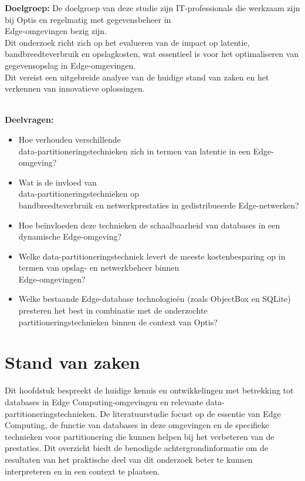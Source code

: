\textbf{Doelgroep:}
De doelgroep van deze studie zijn IT-professionals die werkzaam zijn bij Optis en regelmatig met gegevensbeheer in \\ Edge-omgevingen bezig zijn. \\

Dit onderzoek richt zich op het evalueren van de impact op latentie, bandbreedteverbruik en opslagkosten, wat essentieel is voor het optimaliseren van gegevensopslag in Edge-omgevingen. \\
 Dit vereist een uitgebreide analyse van de huidige stand van zaken en het verkennen van innovatieve oplossingen.

\textbf{\\ Deelvragen:}
\begin{itemize}
    \item Hoe verhouden verschillende \\data-partitioneringstechnieken zich in termen van latentie in een Edge-omgeving?
    \item Wat is de invloed van \\data-partitioneringstechnieken op \\ bandbreedteverbruik en netwerkprestaties in gedistribueerde Edge-netwerken?
    \item Hoe beïnvloeden deze technieken de schaalbaarheid van databases in een dynamische Edge-omgeving?
    \item Welke data-partitioneringstechniek levert de meeste kostenbesparing op in termen van opslag- en netwerkbeheer binnen \\Edge-omgevingen?
    \item Welke bestaande Edge-database technologieën (zoals ObjectBox en SQLite) presteren het best in combinatie met de onderzochte partitioneringstechnieken binnen de context van Optis?
\end{itemize}

\section{Stand van zaken}%
\label{sec:state-of-the-art}

Dit hoofdstuk bespreekt de huidige kennis en ontwikkelingen met betrekking tot databases in Edge Computing-omgevingen en relevante data-partitioneringstechnieken.
De literatuurstudie focust op de essentie van Edge Computing,
 de functie van databases in deze omgevingen en de specifieke technieken voor partitionering die kunnen helpen bij het verbeteren van de prestaties.
 Dit overzicht biedt de benodigde achtergrondinformatie om de resultaten van het praktische deel van dit onderzoek beter te kunnen interpreteren en in een context te plaatsen.

